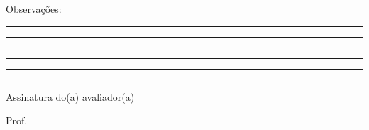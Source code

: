 \FloatBarrier %
\noindent Observações: \rule{0.84\textwidth}{0.4pt}\par
\vspace*{2mm}\noindent\rule{0.99\textwidth}{0.4pt}\par
\vspace*{2mm}\noindent\rule{0.99\textwidth}{0.4pt}\par
\vspace*{2mm}\noindent\rule{0.99\textwidth}{0.4pt}\par
\vspace*{2mm}\noindent\rule{0.99\textwidth}{0.4pt}\par

\vspace*{20mm}   
\begin{center}
    \begin{minipage}[!h]{0.65\textwidth}
        \centering
        \rule{\textwidth}{0.4pt}\par
        \noindent Assinatura do(a) avaliador(a)\par
        \noindent Prof. \MakeUppercase{\avaliador}
    \end{minipage}
\end{center}

